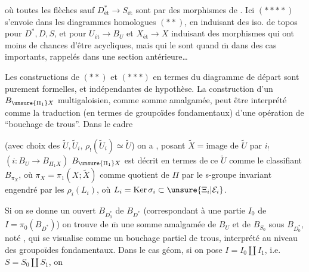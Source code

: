 où toutes les flèches sauf $D^*_{\text{ét}}\longrightarrow S_{\text{ét}}$ sont  par des morphismes de .
Ici $(****)$ s'envoie dans les diagrammes homologues $(**)$, en induisant des iso. de topos pour $D^*,D,S$, et pour $U_{\text{ét}}\longrightarrow B_U$ et $X_{\text{ét}}\longrightarrow X$ induisant des morphismes qui ont moins de chances d'être acycliques, mais qui le sont  quand $\overline{\mathrm m}$ dans des cas importants, rappelés dans une section antérieure\ldots

Les constructions de $(**)$ et $(***)$ en termes du diagramme de départ
sont purement formelles, et indépendantes de  hypothèse.
La construction d'un $B_{\unsure{\Pi_1}X}$ multigaloisien, comme somme amalgamée, peut être interprété comme la traduction (en termes de groupoïdes fondamentaux) d'une opération de ``bouchage de trous''.
 Dans le cadre 


(avec choix des $\widetilde U,\widetilde U_i$, $\rho_!(\widetilde U_i)\simeq\widetilde U$) on a
,
posant $\widetilde X=\text{image de }\widetilde U$ par $i_!$ $(i:B_U\longrightarrow B_{\Pi_1 X})$ $B_{\unsure{\Pi_1}X}$ est décrit en termes de ce $\widetilde U$ comme le  classifiant $B_{\pi_X}$, où $\pi_X=\pi_1(X;\widetilde X)$   comme quotient de $\Pi$ par le s-groupe invariant engendré par les $\rho_i(L_i)$, où $L_i=\operatorname{Ker}\sigma_i\subset\unsure{\Xi_i|\mathcal E_i}$.

Si on se donne un  ouvert $B_{D_0^*}$ de $B_{D^*}$ (correspondant à une partie $I_0$ de $I=\pi_0(B_{D^*})$) on trouve de $\overline{\mathrm m}$ une somme amalgamée de $B_U$ et de $B_{S_0}$ sous $B_{D_0^*}$, noté  , qui se visualise comme un bouchage partiel de trous, interprété au niveau des groupoïdes fondamentaux. Dans le cas géom, si on pose $I=I_0\amalg I_1$, i.e. $S=S_0\amalg S_1$, on


